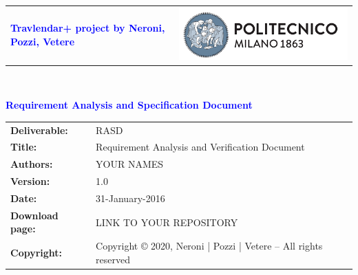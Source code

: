 


    
    
    \begin{titlepage}
        
        
        
        {\begin{table}[t!]
                \centering
                \begin{tabu} to \textwidth { X[1.3,r,p] X[1.7,l,p] }
                    \textcolor{Blue}
                    {\textbf{\small{Travlendar+ project by Neroni, Pozzi, Vetere}}} & \includegraphics[scale=0.4]{Images/PolimiLogo}
                \end{tabu}
            \end{table}}~\\ [7cm]
        
        
        \begin{flushleft}
            
            {\textcolor{blue}{\textbf{\Huge{Requirement Analysis and Specification Document}}}} \\ [1cm]
            
        \end{flushleft}
        
    \end{titlepage}
    
    \begin{table}[h!]
        \begin{tabu} to \textwidth { X[0.3,r,p] X[0.7,l,p] }
            \hline
            
            \textbf{Deliverable:} & RASD\\
            \textbf{Title:} & Requirement Analysis and Verification Document \\
            \textbf{Authors:} & YOUR NAMES \\
            \textbf{Version:} & 1.0 \\ 
            \textbf{Date:} & 31-January-2016 \\
            \textbf{Download page:} & LINK TO YOUR REPOSITORY \\
            \textbf{Copyright:} & Copyright © 2020, Neroni | Pozzi | Vetere – All rights reserved \\
            \hline
        \end{tabu}
    \end{table}
    
